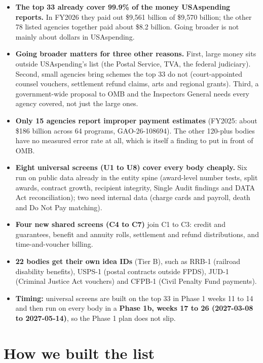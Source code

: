 \documentclass[letterpaper,11pt]{article}
\providecommand{\tightlist}{\setlength{\itemsep}{0pt}\setlength{\parskip}{0pt}}
\begin{document}
\begin{itemize}
\tightlist
\item
  \textbf{The top 33 already cover 99.9\% of the money USAspending
  reports.} In FY2026 they paid out \$9,561 billion of \$9,570 billion;
  the other 78 listed agencies together paid about \$8.2 billion. Going
  broader is not mainly about dollars in USAspending.
\item
  \textbf{Going broader matters for three other reasons.} First, large
  money sits outside USAspending's list (the Postal Service, TVA, the
  federal judiciary). Second, small agencies bring schemes the top 33 do
  not (court-appointed counsel vouchers, settlement refund claims, arts
  and regional grants). Third, a government-wide proposal to OMB and the
  Inspectors General needs every agency covered, not just the large
  ones.
\item
  \textbf{Only 15 agencies report improper payment estimates} (FY2025:
  about \$186 billion across 64 programs, GAO-26-108694). The other
  120-plus bodies have no measured error rate at all, which is itself a
  finding to put in front of OMB.
\item
  \textbf{Eight universal screens (U1 to U8) cover every body cheaply.}
  Six run on public data already in the entity spine (award-level number
  tests, split awards, contract growth, recipient integrity, Single
  Audit findings and DATA Act reconciliation); two need internal data
  (charge cards and payroll, death and Do Not Pay matching).
\item
  \textbf{Four new shared screens (C4 to C7)} join C1 to C3: credit and
  guarantees, benefit and annuity rolls, settlement and refund
  distributions, and time-and-voucher billing.
\item
  \textbf{22 bodies get their own idea IDs} (Tier B), such as RRB-1
  (railroad disability benefits), USPS-1 (postal contracts outside
  FPDS), JUD-1 (Criminal Justice Act vouchers) and CFPB-1 (Civil Penalty
  Fund payments).
\item
  \textbf{Timing:} universal screens are built on the top 33 in Phase 1
  weeks 11 to 14 and then run on every body in a \textbf{Phase 1b, weeks
  17 to 26 (2027-03-08 to 2027-05-14)}, so the Phase 1 plan does not
  slip.
\end{itemize}

\hypertarget{how-we-built-the-list}{%
\section{How we built the list}\label{how-we-built-the-list}}
\end{document}
